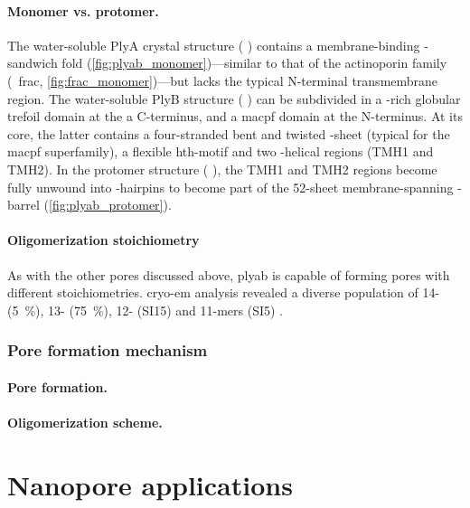 \paragraph{Monomer vs. protomer.}
%
The water-soluble PlyA crystal structure ( \cite{Lukoyanova-Kondos-2015}) contains a
membrane-binding \tb-sandwich fold (\cref{fig:plyab_monomer})---similar to that of the actinoporin family
(\eg~\gls{frac}, \cref{fig:frac_monomer})---but lacks the typical N-terminal transmembrane region. The
water-soluble PlyB structure ( \cite{Lukoyanova-Kondos-2015}) can be subdivided in a \tb-rich
globular trefoil domain at the a C-terminus, and a \gls{macpf} domain at the N-terminus. At its core, the
latter contains a four-stranded bent and twisted \tb-sheet (typical for the \gls{macpf} superfamily), a
flexible \gls{hth}-motif and two \ta-helical regions (TMH1 and TMH2). In the protomer structure (
\cite{Lukoyanova-Kondos-2015}), the TMH1 and TMH2 regions become fully unwound into \tb-hairpins to become
part of the 52-sheet membrane-spanning \tb-barrel (\cref{fig:plyab_protomer}).

\paragraph{Oligomerization stoichiometry}
%
As with the other pores discussed above, \gls{plyab} is capable of forming pores with different
stoichiometries. \Gls{cryo-em} analysis revealed a diverse population of 14- (\SI{5}{\percent}), 13-
(\SI{75}{\percent}), 12- (SI{15}{\percent}) and 11-mers (SI{5}{\percent}) \cite{Lukoyanova-Kondos-2015}.


\subsubsection{Pore formation mechanism}

\paragraph{Pore formation.}
%

\paragraph{Oligomerization scheme.}
%


%
%
\section{Nanopore applications}


